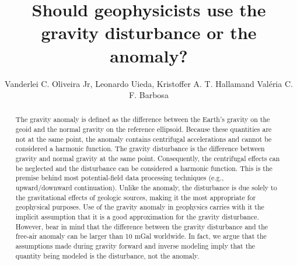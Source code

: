 \documentclass[paper,twocolumn,twoside]{geophysics}
\begin{document}
\title{Should geophysicists use the gravity disturbance or the anomaly?}

\renewcommand{\thefootnote}{\fnsymbol{footnote}} 


\address{
\footnotemark[1]Observat\'{o}rio Nacional, \\
Department of Geophysics, \\
Rio de Janeiro, Brazil \\
\footnotemark[2]University of Hawai'i at M\={a}noa, \\
Department of Geology and Geophysics, SOEST, \\
Honolulu, USA}
\author{Vanderlei C. Oliveira Jr\footnotemark[1], Leonardo Uieda\footnotemark[2],
Kristoffer A. T. Hallam\footnotemark[1] and Val\'{e}ria C. F. Barbosa\footnotemark[1]}


\maketitle

\begin{abstract}
  The gravity anomaly is defined as the difference between the Earth's gravity
 on the geoid and the normal gravity on the reference ellipsoid.
 Because these quantities are not at the same point, the anomaly contains
 centrifugal accelerations and cannot be considered a harmonic function.
 The gravity disturbance is the difference between gravity and normal gravity
 at the same point.
 Consequently, the centrifugal effects can be neglected and the disturbance can
 be considered a harmonic function.
 This is the premise behind most potential-field data processing techniques
 (e.g., upward/downward continuation).
 Unlike the anomaly, the disturbance is due solely to the
 gravitational effects of geologic sources, making it the most appropriate
 for geophysical purposes.
 Use of the gravity anomaly in geophysics carries with it the implicit
 assumption that it is a good approximation for the gravity disturbance.
 However, bear in mind that the difference between the gravity disturbance and
 the free-air anomaly can be larger than 10 mGal worldwide.
 In fact, we argue that the assumptions made during gravity forward and inverse
 modeling imply that the quantity being modeled is the disturbance, not the
 anomaly.
\end{abstract}
\end{document}

